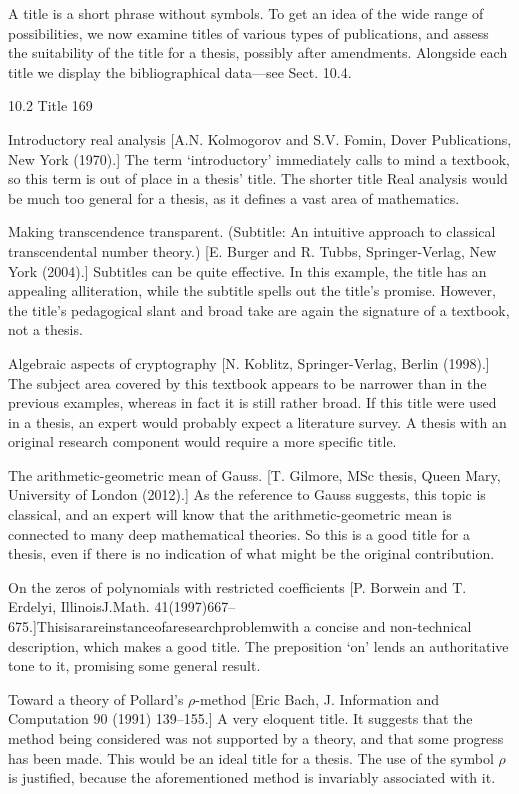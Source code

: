 \documentclass[11pt]{article}
\theoremstyle{plain}
\theoremstyle{definition}
\begin{document}
A title is a short phrase without symbols. To get an idea of the wide range of possibilities, we now examine titles of various types of publications, and assess the suitability of the title for a thesis, possibly after amendments. Alongside each title we display the bibliographical data---see Sect. 10.4.

10.2 Title 169

Introductory real analysis [A.N. Kolmogorov and S.V. Fomin, Dover Publications, New York (1970).] The term `introductory' immediately calls to mind a textbook, so this term is out of place in a thesis' title. The shorter title Real analysis would be much too general for a thesis, as it defines a vast area of mathematics.

Making transcendence transparent. (Subtitle: An intuitive approach to classical transcendental number theory.) [E. Burger and R. Tubbs, Springer-Verlag, New York (2004).] Subtitles can be quite effective. In this example, the title has an appealing alliteration, while the subtitle spells out the title's promise. However, the title's pedagogical slant and broad take are again the signature of a textbook, not a thesis.

Algebraic aspects of cryptography [N. Koblitz, Springer-Verlag, Berlin (1998).] The subject area covered by this textbook appears to be narrower than in the previous examples, whereas in fact it is still rather broad. If this title were used in a thesis, an expert would probably expect a literature survey. A thesis with an original research component would require a more specific title.

The arithmetic-geometric mean of Gauss. [T. Gilmore, MSc thesis, Queen Mary, University of London (2012).] As the reference to Gauss suggests, this topic is classical, and an expert will know that the arithmetic-geometric mean is connected to many deep mathematical theories. So this is a good title for a thesis, even if there is no indication of what might be the original contribution.

On the zeros of polynomials with restricted coefficients [P. Borwein and T. Erdelyi, IllinoisJ.Math. 41(1997)667--675.]Thisisarareinstanceofaresearchproblemwith a concise and non-technical description, which makes a good title. The preposition `on' lends an authoritative tone to it, promising some general result.

Toward a theory of Pollard's $\rho$-method [Eric Bach, J. Information and Computation 90 (1991) 139--155.] A very eloquent title. It suggests that the method being considered was not supported by a theory, and that some progress has been made. This would be an ideal title for a thesis. The use of the symbol $\rho$ is justified, because the aforementioned method is invariably associated with it.
\end{document}

